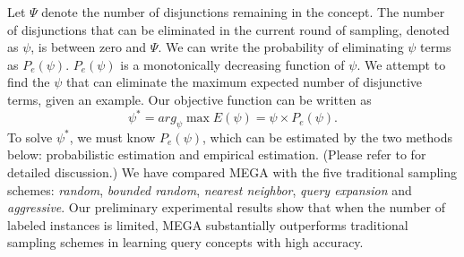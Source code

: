 Let $\Psi$ denote the number of disjunctions remaining in the concept.
The number of disjunctions that can be eliminated in the current round
of sampling, denoted as $\psi$, is between zero and $\Psi$.  We can
write the probability of eliminating $\psi$ terms as $P_e(\psi)$.
$P_e(\psi)$ is a monotonically decreasing function of $\psi$.
We attempt to find the $\psi$ that
can eliminate the maximum expected number
of disjunctive terms, given an example.
Our objective function can be written as
\begin{equation}
\psi^{*} = arg_{\psi} \max E(\psi) = \psi \times P_e(\psi).
\label{eq-mega}
\end{equation}
To solve $\psi^{*}$, we must know $P_e(\psi)$, which
can be estimated by the two methods below: probabilistic estimation
and empirical estimation.
(Please refer to \cite{CL01} for detailed discussion.)
We have compared MEGA with the five traditional sampling schemes:
{\it random}, {\it bounded random}, {\it nearest neighbor},
{\it query expansion} and {\it aggressive}.
Our preliminary experimental
results show that when the
number of labeled instances is limited, 
MEGA substantially outperforms traditional
sampling schemes in learning query concepts with high accuracy. 

